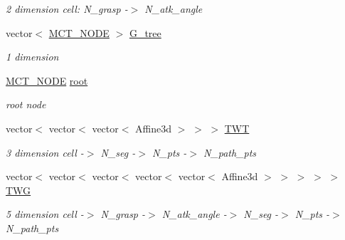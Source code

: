 \begin{DoxyCompactItemize}
\begin{DoxyCompactList}\small\item\em 2 dimension cell\+: N\+\_\+grasp -\/$>$ N\+\_\+atk\+\_\+angle \end{DoxyCompactList}\item 
\mbox{\label{classMCT__Search_a7e207d8c0fd99112e7ce72daf36de4c9}} 
vector$<$ \hyperlink{classMCT__NODE}{M\+C\+T\+\_\+\+N\+O\+DE} $>$ \hyperlink{classMCT__Search_a7e207d8c0fd99112e7ce72daf36de4c9}{G\+\_\+tree}
\begin{DoxyCompactList}\small\item\em 1 dimension \end{DoxyCompactList}\item 
\mbox{\label{classMCT__Search_ac6b8ef83f9905c9e44b3d30cfb26aa92}} 
\hyperlink{classMCT__NODE}{M\+C\+T\+\_\+\+N\+O\+DE} \hyperlink{classMCT__Search_ac6b8ef83f9905c9e44b3d30cfb26aa92}{root}
\begin{DoxyCompactList}\small\item\em root node \end{DoxyCompactList}\item 
\mbox{\label{classMCT__Search_acfaa1742689efc53380c582dfba2dba3}} 
vector$<$ vector$<$ vector$<$ Affine3d $>$ $>$ $>$ \hyperlink{classMCT__Search_acfaa1742689efc53380c582dfba2dba3}{T\+WT}
\begin{DoxyCompactList}\small\item\em 3 dimension cell -\/$>$ N\+\_\+seg -\/$>$ N\+\_\+pts -\/$>$ N\+\_\+path\+\_\+pts \end{DoxyCompactList}\item 
\mbox{\label{classMCT__Search_a419e573fd9b49407de6184a705a9f1fe}} 
vector$<$ vector$<$ vector$<$ vector$<$ vector$<$ Affine3d $>$ $>$ $>$ $>$ $>$ \hyperlink{classMCT__Search_a419e573fd9b49407de6184a705a9f1fe}{T\+WG}
\begin{DoxyCompactList}\small\item\em 5 dimension cell -\/$>$ N\+\_\+grasp -\/$>$ N\+\_\+atk\+\_\+angle -\/$>$ N\+\_\+seg -\/$>$ N\+\_\+pts -\/$>$ N\+\_\+path\+\_\+pts \end{DoxyCompactList}\item 
\mbox{\label{classMCT__Search_a9f238c1dbae2956a4522ad9b71cd370c}} 

\end{DoxyCompactItemize}
